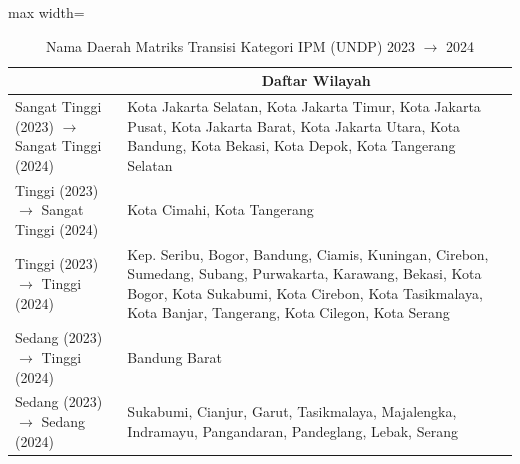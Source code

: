 \begin{table}[H]
\centering
\caption{Nama Daerah Matriks Transisi Kategori IPM (UNDP) 2023 \(\rightarrow\) 2024} \label{tab:app1ipmname2023x2024}
\begin{adjustbox}{max width=\textwidth}
\begin{tabular}{|>{\centering\arraybackslash}p{4cm}|p{10cm}|}
\hline
\multicolumn{1}{|c|}{\textbf{Kategori}} & \multicolumn{1}{c|}{\textbf{Daftar Wilayah}} \\
\hline
Sangat Tinggi (2023) \(\rightarrow\) Sangat Tinggi (2024) & Kota Jakarta Selatan, Kota Jakarta Timur, Kota Jakarta Pusat, Kota Jakarta Barat, Kota Jakarta Utara, Kota Bandung, Kota Bekasi, Kota Depok, Kota Tangerang Selatan \\
\hline
Tinggi (2023) \(\rightarrow\) Sangat Tinggi (2024) & Kota Cimahi, Kota Tangerang \\
\hline
Tinggi (2023) \(\rightarrow\) Tinggi (2024) & Kep. Seribu, Bogor, Bandung, Ciamis, Kuningan, Cirebon, Sumedang, Subang, Purwakarta, Karawang, Bekasi, Kota Bogor, Kota Sukabumi, Kota Cirebon, Kota Tasikmalaya, Kota Banjar, Tangerang, Kota Cilegon, Kota Serang \\
\hline
Sedang (2023) \(\rightarrow\) Tinggi (2024) & Bandung Barat \\
\hline
Sedang (2023) \(\rightarrow\) Sedang (2024) & Sukabumi, Cianjur, Garut, Tasikmalaya, Majalengka, Indramayu, Pangandaran, Pandeglang, Lebak, Serang \\
\hline
\end{tabular}
\end{adjustbox}
\end{table}